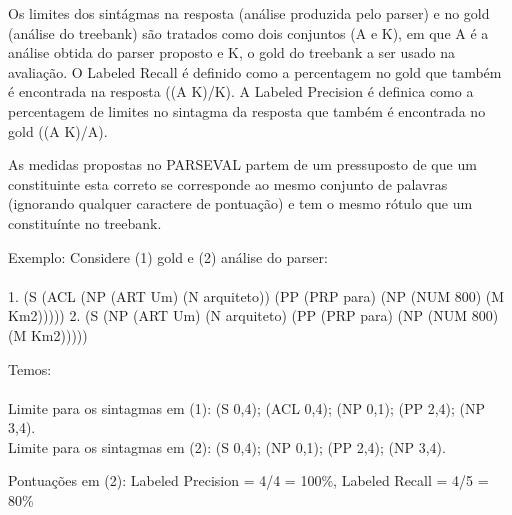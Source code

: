 Os limites dos sintágmas na resposta (análise produzida pelo parser) e no gold (análise do treebank) são tratados como dois conjuntos (A e K), em que A é a análise obtida do parser proposto e K, o gold do treebank a ser usado na avaliação. O Labeled Recall
é definido como a percentagem no gold que também é encontrada na resposta ((A K)/K). A Labeled Precision é definica como a percentagem de limites no sintagma da resposta que também é encontrada no gold ((A K)/A).

As medidas propostas no PARSEVAL partem de um pressuposto de que um constituinte esta correto se corresponde ao mesmo conjunto de palavras (ignorando qualquer caractere de pontuação) e tem o mesmo rótulo que um constituínte no treebank.


Exemplo: Considere (1) gold e (2) análise do parser:\\ \\

1. (S (ACL (NP (ART Um) (N arquiteto)) (PP (PRP para) (NP (NUM 800) (M Km2)))))
2. (S (NP (ART Um) (N arquiteto) (PP (PRP para) (NP (NUM 800) (M Km2)))))

Temos:\\ \\
Limite para os sintagmas em (1): (S 0,4); (ACL 0,4); (NP 0,1); (PP 2,4); (NP 3,4). \\
Limite para os sintagmas em (2): (S 0,4); (NP 0,1); (PP 2,4); (NP 3,4).

Pontuações em (2): Labeled Precision = 4/4 = 100{\%}, Labeled Recall = 4/5 = 80{\%}




